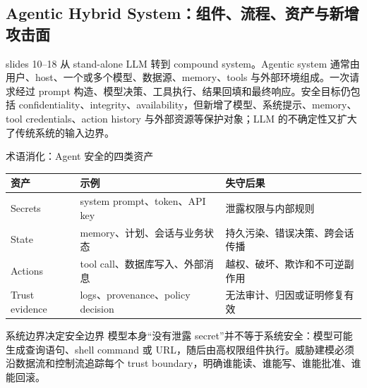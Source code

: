 \subsection{Agentic Hybrid System：组件、流程、资产与新增攻击面}

slides 10--18 从 stand-alone LLM 转到 compound system。Agentic system 通常由用户、host、一个或多个模型、数据源、memory、tools 与外部环境组成。一次请求经过 prompt 构造、模型决策、工具执行、结果回填和最终响应。安全目标仍包括 confidentiality、integrity、availability，但新增了模型、系统提示、memory、tool credentials、action history 与外部资源等保护对象；LLM 的不确定性又扩大了传统系统的输入边界。


\begin{knowledgebox}{术语消化：Agent 安全的四类资产}
\begin{tabular}{p{2.7cm}p{4.2cm}p{5.3cm}}
\toprule
\textbf{资产} & \textbf{示例} & \textbf{失守后果} \\
\midrule
Secrets & system prompt、token、API key & 泄露权限与内部规则 \\
State & memory、计划、会话与业务状态 & 持久污染、错误决策、跨会话传播 \\
Actions & tool call、数据库写入、外部消息 & 越权、破坏、欺诈和不可逆副作用 \\
Trust evidence & logs、provenance、policy decision & 无法审计、归因或证明修复有效 \\
\bottomrule
\end{tabular}
\end{knowledgebox}

\begin{importantbox}{系统边界决定安全边界}
模型本身“没有泄露 secret”并不等于系统安全：模型可能生成查询语句、shell command 或 URL，随后由高权限组件执行。威胁建模必须沿数据流和控制流追踪每个 trust boundary，明确谁能读、谁能写、谁能批准、谁能回滚。
\end{importantbox}

